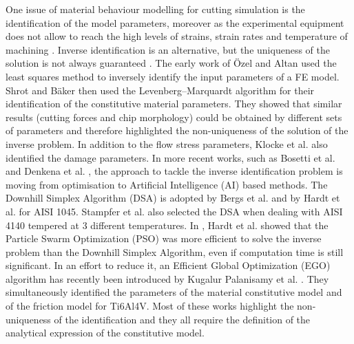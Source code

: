\documentclass[preprint,12pt,times]{elsarticle}
\begin{document}
One issue of material behaviour modelling for cutting simulation is the identification of the model parameters, moreover as the experimental equipment does not allow to reach the high levels of strains, strain rates and temperature of machining \cite{melkote_Advances_2017}. Inverse identification is an alternative, but the uniqueness of the solution is not always guaranteed \cite{arrazola_Recent_2013, melkote_Advances_2017}. The early work of Özel and Altan \cite{ozel_Determination_2000} used  the least squares method to inversely identify the input parameters of a FE model. Shrot and Bäker \cite{shrot_Determination_2012} then used the Levenberg–Marquardt algorithm for their identification of the constitutive material parameters. They showed that similar results (cutting forces and chip morphology) could be obtained by different sets of parameters and therefore highlighted the non-uniqueness of the solution of the inverse problem. In addition to the flow stress parameters, Klocke et al. \cite{klocke_Orthogonal_2013} also identified the damage parameters. In more recent works, such as Bosetti et al. \cite{bosetti_Identification_2013} and Denkena et al. \cite{denkena_Inverse_2015}, the approach to tackle the inverse identification problem is moving from optimisation to Artificial Intelligence (AI) based methods. The Downhill Simplex Algorithm (DSA) is adopted by Bergs et al. \cite{bergs_Determination_2020} and by Hardt et al. \cite{hardt_Investigations_2021} for AISI 1045. Stampfer et al. \cite{stampfer_Material_2021} also selected the DSA when dealing with AISI 4140 tempered at 3 different temperatures. In \cite{hardt_Application_2021}, Hardt et al. showed that the Particle Swarm Optimization (PSO) was more efficient to solve the inverse problem than the Downhill Simplex Algorithm, even if computation time is still significant. In an effort to reduce it, an Efficient Global Optimization (EGO) algorithm has recently been introduced by Kugalur Palanisamy et al. \cite{kugalurpalanisamy_Identification_2022}. They simultaneously identified the parameters of the material constitutive model and of the friction model for Ti6Al4V. Most of these works highlight the non-uniqueness of the identification and they all require the definition of the analytical expression of the constitutive model.
\end{document}
